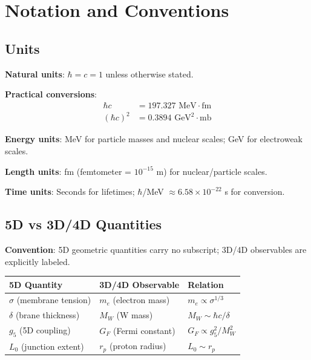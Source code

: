 \chapter{Notation and Conventions}
\label{app:notation}

\section{Units}

\textbf{Natural units}: $\hbar = c = 1$ unless otherwise stated.

\textbf{Practical conversions}:
\begin{align}
\hbar c &= 197.327 \text{ MeV} \cdot \text{fm} \\
(\hbar c)^2 &= 0.3894 \text{ GeV}^2 \cdot \text{mb}
\end{align}

\textbf{Energy units}: MeV for particle masses and nuclear scales;
GeV for electroweak scales.

\textbf{Length units}: fm (femtometer = $10^{-15}$ m) for nuclear/particle scales.

\textbf{Time units}: Seconds for lifetimes; $\hbar$/MeV $\approx 6.58 \times 10^{-22}$ s
for conversion.

\section{5D vs 3D/4D Quantities}

\textbf{Convention}: 5D geometric quantities carry no subscript;
3D/4D observables are explicitly labeled.

\begin{center}
\begin{tabular}{lll}
\toprule
\textbf{5D Quantity} & \textbf{3D/4D Observable} & \textbf{Relation} \\
\midrule
$\sigma$ (membrane tension) & $m_e$ (electron mass) & $m_e \propto \sigma^{1/3}$ \\
$\delta$ (brane thickness) & $M_W$ (W mass) & $M_W \sim \hbar c/\delta$ \\
$g_5$ (5D coupling) & $G_F$ (Fermi constant) & $G_F \propto g_5^2/M_W^2$ \\
$L_0$ (junction extent) & $r_p$ (proton radius) & $L_0 \sim r_p$ \\
\bottomrule
\end{tabular}
\end{center}

